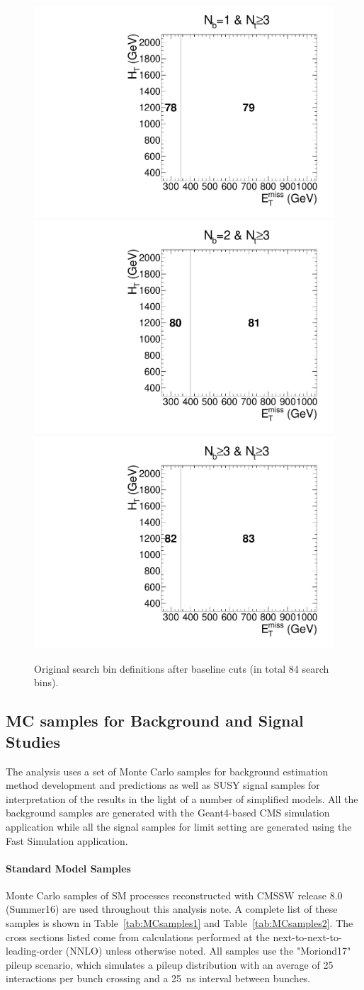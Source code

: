 \begin{figure}[h]
\begin{center}
    \includegraphics[width=0.30\linewidth]{sections/mc4/EvtSelSBOpt/figures/poly_MT2_vs_met_6.pdf} 
    \includegraphics[width=0.30\linewidth]{sections/mc4/EvtSelSBOpt/figures/poly_MT2_vs_met_7.pdf} 
    \includegraphics[width=0.30\linewidth]{sections/mc4/EvtSelSBOpt/figures/poly_MT2_vs_met_8.pdf} \\
    \caption{Original search bin definitions after baseline cuts (in total 84 search bins). }
    \label{fig:SBXX}
  \end{center}
\end{figure}

\subsection{MC samples for Background and Signal Studies}
\label{sec:sm-mc}

The analysis uses a set of Monte Carlo samples for background estimation method
development and predictions as well as SUSY signal samples for interpretation
of the results in the light of a number of simplified models. All the
background samples are generated with the Geant4-based CMS simulation 
application while all the signal samples for limit setting are generated
using the Fast Simulation application.

\paragraph{Standard Model Samples}

Monte Carlo samples of SM processes reconstructed with CMSSW release 8.0 (Summer16) are used throughout this analysis note. A complete list of these samples is shown in Table~\ref{tab:MCsamples1} and Table~\ref{tab:MCsamples2}. The cross sections listed come from calculations performed at the next-to-next-to-leading-order (NNLO) unless otherwise noted. All samples use the "Moriond17" pileup scenario, which simulates a pileup distribution with an average of 25 interactions per bunch crossing and a 25~ns interval between bunches.

